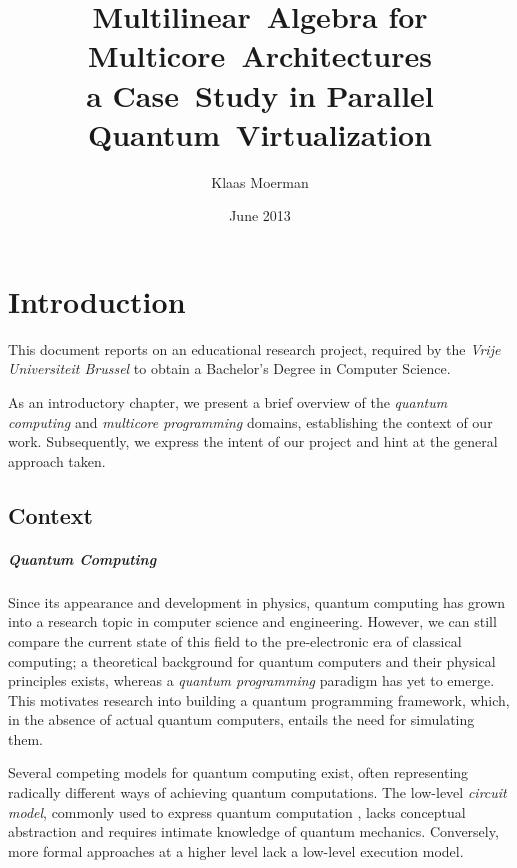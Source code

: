 \documentclass[a4paper,11pt, oneside]{report}
\author{\Large Klaas Moerman}
\title{\LARGE \bf Multilinear~Algebra for Multicore~Architectures \\
	                   a Case~Study in Parallel Quantum~Virtualization}
\date{June 2013}
\newcommand{\concept}[1]{\emph{#1}}
\newcommand{\dutch}[1]{\textsl{#1}}
\begin{document}
\maketitlepage

\pagestyle{plain}


\clearpage
\setcounter{page}{1}
\tableofcontents
\clearpage

\pagestyle{fancy}
\lhead{\nouppercase{\rightmark}}
\rhead{\nouppercase{\leftmark}}
\renewcommand{\chaptermark}[1]{\markboth{#1}{}}
\renewcommand{\sectionmark}[1]{\markright{{\bf \thesection.\ #1}}}

\chapter{Introduction}
This document reports on an educational research project, required by the \dutch{Vrije Universiteit Brussel} to obtain a Bachelor's Degree in Computer Science.


As an introductory chapter, we present a brief overview of the \concept{quantum computing} and \concept{multicore programming} domains, establishing the context of our work. Subsequently, we express the intent of our project and hint at the general approach taken.


\section{Context}
\paragraph{Quantum Computing} Since its appearance \cite{feynman82} and development \cite{deutsch85, feynman86} in physics, quantum computing has grown into a research topic in computer science and engineering. However, we can still compare the current state of this field to the pre-electronic era of classical computing; a theoretical background for quantum computers and their physical principles exists, whereas a \concept{quantum programming} paradigm has yet to emerge. This motivates research into building a quantum programming framework, which, in the absence of actual quantum computers, entails the need for simulating them.


Several competing models for quantum computing exist, often representing radically different ways of achieving quantum computations. The low-level \concept{circuit model}, commonly used to express quantum computation \cite{nielsen-chuang, kaye-laflamme-mosca}, lacks conceptual abstraction and requires intimate knowledge of quantum mechanics. Conversely, more formal approaches at a higher level \cite{selinger-valiron, grattage} lack a low-level execution model. 
\end{document}

